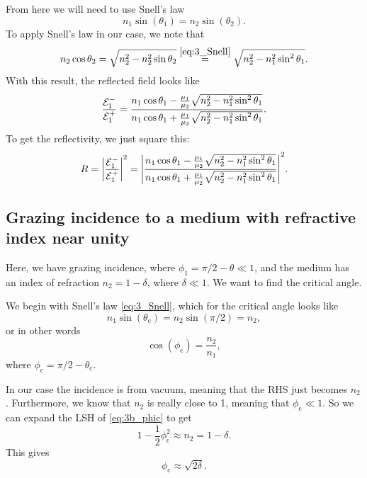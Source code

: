 \documentclass[11pt,letter, swedish, english
]{article}
\begin{document}
From here we will need to use Snell's law
\begin{equation}\label{eq:3_Snell}
n_1\sin(\theta_1) = n_2\sin(\theta_2).
\end{equation}
To apply Snell's law in our case, we note that
\begin{equation}
n_2\cos\theta_2 = \sqrt{n_2^2 - n_2^2\sin\theta_2}
\stackrel{\eqref{eq:3_Snell}}{=} \sqrt{n_2^2 - n_1^2\sin^2\theta_1}.
\end{equation}
With this result, the reflected field looks like
\begin{equation}\label{eq:3a_refl-ampl}
\frac{{\mathcal{E}_1^-}}{{\mathcal{E}_1^+}}=
\frac{n_1\cos\theta_1 - 
\frac{\mu_1}{\mu_2}\sqrt{n_2^2-n_1^2\sin^2\theta_1}}
{n_1\cos\theta_1 + \frac{\mu_1}{\mu_2}\sqrt{n_2^2-n_1^2\sin^2\theta_1}}.
\end{equation}
To get the reflectivity, we just square this:
\begin{equation}
R=\abs{\frac{{\mathcal{E}_1^-}}{{\mathcal{E}_1^+}}}^2=
\abs{\frac{n_1\cos\theta_1 - 
\frac{\mu_1}{\mu_2}\sqrt{n_2^2-n_1^2\sin^2\theta_1}}
{n_1\cos\theta_1 + \frac{\mu_1}{\mu_2}\sqrt{n_2^2-n_1^2\sin^2\theta_1}}
}^2.
\end{equation}





\subsection{Grazing incidence to a medium with 
refractive index near unity}
\newcommand{\thetac}{\theta_\text{c}}
\newcommand{\phic}{\phi_\text{c}}

Here, we have grazing incidence, where 
$\phi_1=\pi/2 - \theta\ll1$, and the medium has an index of refraction
$n_2=1-\delta$, where $\delta\ll1$. We want to find the critical angle. 

We begin with Snell's law \eqref{eq:3_Snell},
which for the critical angle looks like
\begin{equation}
n_1\sin(\thetac) = n_2\sin(\pi/2) = n_2,
\end{equation}
or in other words
\begin{equation}\label{eq:3b_phic}
\cos(\phic) = \frac{n_2}{n_1},
\end{equation}
where $\phic=\pi/2-\thetac$.

In our case the incidence is from vacuum, meaning that the RHS just
becomes $n_2$. Furthermore, we know that $n_2$ is really close to 1,
meaning that $\phic\ll1$. So we can expand the LSH of
\eqref{eq:3b_phic} to get
\begin{equation}
1-\frac{1}{2}\phic^2 \approx n_2 = 1-\delta.
\end{equation}
This gives
\begin{equation}\label{eq:3b_phic}
\phic \approx \sqrt{2\delta}.
\end{equation}
\end{document}
